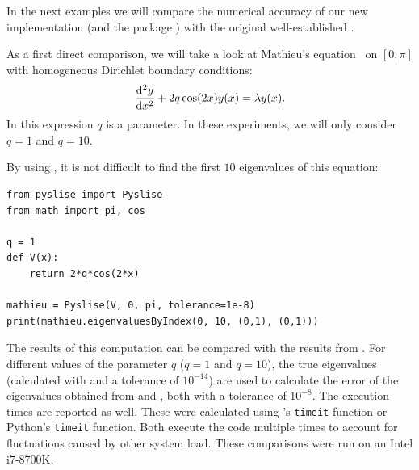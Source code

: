 In the next examples we will compare the numerical accuracy of our new implementation  (and the \lpython{} package \pyslise{}) with the original well-established .

As a first direct comparison, we will take a look at Mathieu's equation~\cite{pryce_sltstpak_1999} on $[0, \pi]$ with homogeneous Dirichlet boundary conditions: \begin{equation}
    \dv[2]{y}{x} + 2q\cos(2x)y(x) = \lambda y(x) \text{.}\label{equ:c2_mathieu_equation}
\end{equation}
In this expression $q$ is a parameter. In these experiments, we will only consider $q=1$ and $q=10$.

By using \pyslise{}, it is not difficult to find the first $10$ eigenvalues of this equation:

\begin{verbatim}
from pyslise import Pyslise
from math import pi, cos

q = 1
def V(x):
    return 2*q*cos(2*x)

mathieu = Pyslise(V, 0, pi, tolerance=1e-8)
print(mathieu.eigenvaluesByIndex(0, 10, (0,1), (0,1)))
\end{verbatim}

The results of this computation can be compared with the results from . For different values of the parameter $q$ ($q = 1$ and $q = 10$), the true eigenvalues (calculated with  and a tolerance of $10^{-14}$) are used to calculate the error of the eigenvalues obtained from  and \pyslise{}, both with a tolerance of $10^{-8}$. The execution times are reported as well. These were calculated using \matlab{}'s \texttt{timeit} function or Python's \texttt{timeit} function. Both execute the code multiple times to account for fluctuations caused by other system load. These comparisons were run on an Intel i7-8700K.

